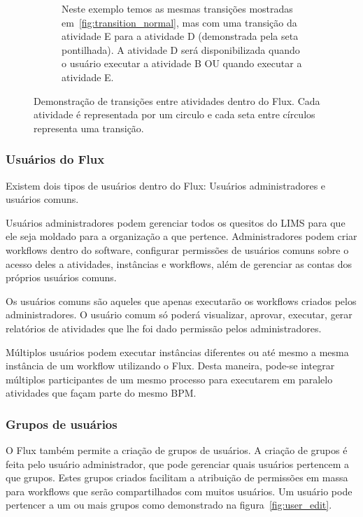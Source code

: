\begin{figure}
\begin{subfigure}[b]{0.45\textwidth}
        \caption{Neste exemplo temos as mesmas transições mostradas em~\ref{fig:transition_normal}, mas com uma transição da atividade E para a atividade D (demonstrada pela seta pontilhada). A atividade D será disponibilizada quando o usuário executar a atividade B OU quando executar a atividade E.}
        \label{fig:transition_ref}
    \end{subfigure}
    \caption{Demonstração de transições entre atividades dentro do Flux. Cada atividade é representada por um circulo e cada seta entre círculos representa uma transição.}
    \label{fig:transitions}
\end{figure}

\subsubsection{Usuários do Flux}

Existem dois tipos de usuários dentro do Flux: Usuários administradores e usuários comuns.

Usuários administradores podem gerenciar todos os quesitos do LIMS para que ele seja moldado para a organização a que pertence. Administradores podem criar workflows dentro do software, configurar permissões de usuários comuns sobre o acesso deles a atividades, instâncias e workflows, além de gerenciar as contas dos próprios usuários comuns.

Os usuários comuns são aqueles que apenas executarão os workflows criados pelos administradores. O usuário comum só poderá visualizar, aprovar, executar, gerar relatórios de atividades que lhe foi dado permissão pelos administradores.

Múltiplos usuários podem executar instâncias diferentes ou até mesmo a mesma instância de um workflow utilizando o Flux. Desta maneira, pode-se integrar múltiplos participantes de um mesmo processo para executarem em paralelo atividades que façam parte do mesmo BPM.

\subsubsection{Grupos de usuários}

O Flux também permite a criação de grupos de usuários. A criação de grupos é feita pelo usuário administrador, que pode gerenciar quais usuários pertencem a que grupos.
Estes grupos criados facilitam a atribuição de permissões em massa para workflows que serão compartilhados com muitos usuários.
Um usuário pode pertencer a um ou mais grupos como demonstrado na figura~\ref{fig:user_edit}.

